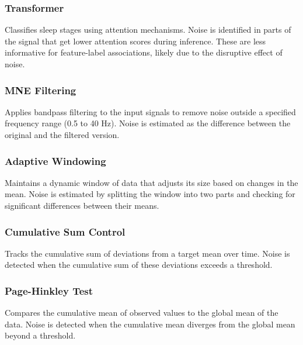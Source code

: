 
\subsubsection{Transformer}
Classifies sleep stages using attention mechanisms. Noise is identified in parts of the signal that get lower attention scores during inference. These are less informative for feature-label associations, likely due to the disruptive effect of noise.

\subsubsection{MNE Filtering}
Applies bandpass filtering to the input signals to remove noise outside a specified frequency range (0.5 to 40 Hz). Noise is estimated as the difference between the original and the filtered version.

\subsubsection{Adaptive Windowing}
Maintains a dynamic window of data that adjusts its size based on changes in the mean. Noise is estimated by splitting the window into two parts and checking for significant differences between their means.

\subsubsection{Cumulative Sum Control}
Tracks the cumulative sum of deviations from a target mean over time. Noise is detected when the cumulative sum of these deviations exceeds a threshold.

\subsubsection{Page-Hinkley Test}
Compares the cumulative mean of observed values to the global mean of the data. Noise is detected when the cumulative mean diverges from the global mean beyond a threshold.

